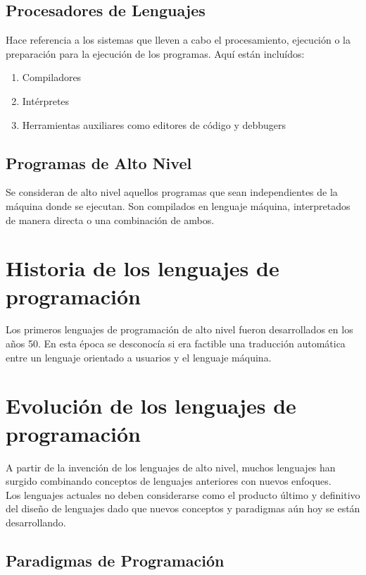 \documentclass{report}
\theoremstyle{mytheoremstyle}
\theoremstyle{mytheoremstyle}
\theoremstyle{myproblemstyle}
\begin{document}
    \subsection*{Procesadores de Lenguajes}

    Hace referencia a los sistemas que lleven a cabo el procesamiento, ejecución o la preparación para la ejecución de los programas. Aquí están incluídos:

    \begin{enumerate}
        \item Compiladores
        \item Intérpretes
        \item Herramientas auxiliares como editores de código y debbugers
    \end{enumerate}
    
    \subsection*{Programas de Alto Nivel}

    Se consideran de alto nivel aquellos programas que sean independientes de la máquina donde se ejecutan. Son compilados en lenguaje máquina, interpretados de manera directa o una combinación de ambos.

    \section{Historia de los lenguajes de programación}

    Los primeros lenguajes de programación de alto nivel fueron desarrollados en los años 50. En esta época se desconocía si era factible una traducción automática entre un lenguaje orientado a usuarios y el lenguaje máquina.

    \section{Evolución de los lenguajes de programación}

    A partir de la invención de los lenguajes de alto nivel, muchos lenguajes han surgido combinando conceptos de lenguajes anteriores con nuevos enfoques. \\

    Los lenguajes actuales no deben considerarse como el producto último y definitivo del diseño de lenguajes dado que nuevos conceptos y paradigmas aún hoy se están desarrollando.

    \subsection*{Paradigmas de Programación}
\end{document}
